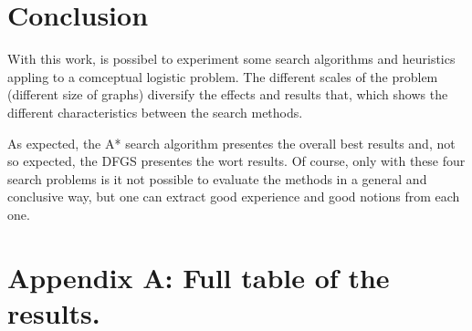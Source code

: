 \documentclass[a4paper]{article}
\begin{document}
\newpage

\section{Conclusion}

With this work, is possibel to experiment some search algorithms and heuristics appling to a comceptual logistic problem. The different scales of the problem (different size of graphs) diversify the effects and results that, which shows the different characteristics between the search methods.

As expected,  the A* search algorithm presentes the overall best results and, not so expected, the DFGS presentes the wort results. Of course, only with these four search problems is it not possible to evaluate the methods in a general and conclusive way, but one can extract good experience and good notions from each one.

\section{Appendix A: Full table of the results.}





\end{document}
